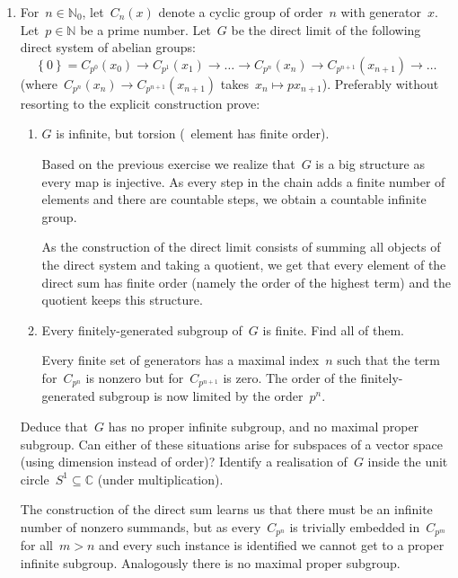 \documentclass[a4paper,11pt]{article}
\begin{document}
\begin{enumerate}
  \item For~$n\in\mathbb{N}_0$, let~$C_n(x)$ denote a cyclic group of order~$n$ with generator~$x$. Let~$p\in\mathbb{N}$ be a prime number. Let~$G$ be the direct limit of the following direct system of abelian groups:
    \begin{equation}
      \left\{ 0 \right\}=C_{p^0}(x_0)\rightarrow C_{p^1}(x_1)\rightarrow\ldots\rightarrow C_{p^n}(x_n)\rightarrow C_{p^{n+1}}(x_{n+1})\rightarrow\ldots
    \end{equation}
    (where~$C_{p^n}(x_n)\rightarrow C_{p^{n+1}}(x_{n+1})$ takes~$x_n\mapsto px_{n+1}$). Preferably without resorting to the explicit construction prove:
    \begin{enumerate}
      \item $G$ is infinite, but torsion (\ie~element has finite order).

        \begin{solution}
          Based on the previous exercise we realize that~$G$ is a big structure as every map is injective. As every step in the chain adds a finite number of elements and there are countable steps, we obtain a countable infinite group.

          As the construction of the direct limit consists of summing all objects of the direct system and taking a quotient, we get that every element of the direct sum has finite order (namely the order of the highest term) and the quotient keeps this structure.
        \end{solution}

      \item Every finitely-generated subgroup of~$G$ is finite. Find all of them.

        \begin{solution}
          Every finite set of generators has a maximal index~$n$ such that the term for~$C_{p^n}$ is nonzero but for~$C_{p^{n+1}}$ is zero. The order of the finitely-generated subgroup is now limited by the order~$p^n$.
        \end{solution}
    \end{enumerate}

    Deduce that~$G$ has no proper infinite subgroup, and no maximal proper subgroup. Can either of these situations arise for subspaces of a vector space (using dimension instead of order)? Identify a realisation of~$G$ inside the unit circle~$S^1\subseteq\mathbb{C}$ (under multiplication).

    \begin{solution}
      The construction of the direct sum learns us that there must be an infinite number of nonzero summands, but as every~$C_{p^n}$ is trivially embedded in~$C_{p^m}$ for all~$m>n$ and every such instance is identified we cannot get to a proper infinite subgroup. Analogously there is no maximal proper subgroup.


\end{solution}
\end{enumerate}
\end{document}
